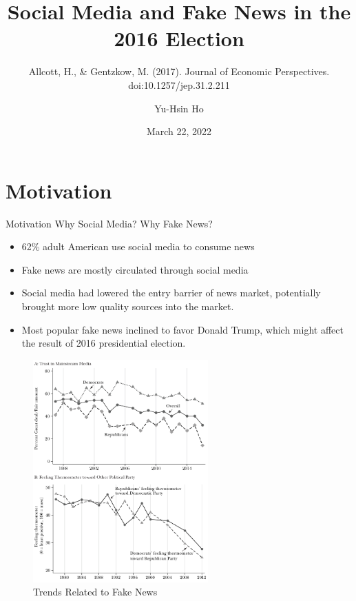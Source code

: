 \documentclass[
  10pt,
  ignorenonframetext,
  aspectratio=43,
]{beamer}
\title{Social Media and Fake News in the 2016 Election}
\subtitle{Allcott, H., \& Gentzkow, M. (2017). Journal of Economic
Perspectives. doi:10.1257/jep.31.2.211}
\author{Yu-Hsin Ho}
\date{March 22, 2022}
\institute{Department of Economics, National Taiwan University}
\providecommand{\tightlist}{%
  \setlength{\itemsep}{0pt}\setlength{\parskip}{0pt}}
\begin{document}
\frame{\titlepage}

\begin{frame}
  \tableofcontents[hideallsubsections]
\end{frame}
\hypertarget{motivation}{%
\section{Motivation}\label{motivation}}

\begin{frame}{Motivation}
Why Social Media? Why Fake News?

\begin{itemize}
\tightlist
\item
  62\% adult American use social media to consume news
\item
  Fake news are mostly circulated through social media
\item
  Social media had lowered the entry barrier of news market, potentially
  brought more low quality sources into the market.
\item
  Most popular fake news inclined to favor Donald Trump, which might
  affect the result of 2016 presidential election.
\end{itemize}
\end{frame}

\begin{frame}
\begin{figure}
\centering
\includegraphics[width=0.6\textwidth,height=\textheight]{20220315-allcott-gentzkow-2016-election-fake-news.assets/image-20220314191028856.png}
\caption{Trends Related to Fake News}
\end{figure}
\end{frame}
\end{document}
